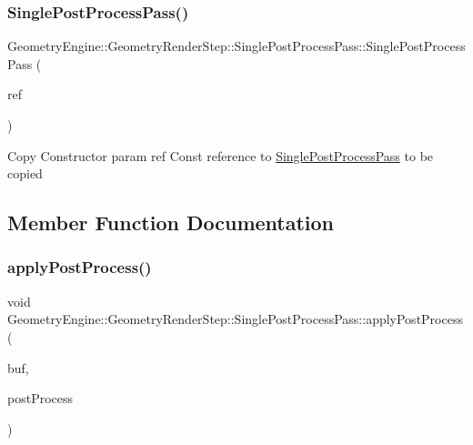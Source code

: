 \subsubsection{\texorpdfstring{SinglePostProcessPass()}{SinglePostProcessPass()}}
{\footnotesize\ttfamily Geometry\+Engine\+::\+Geometry\+Render\+Step\+::\+Single\+Post\+Process\+Pass\+::\+Single\+Post\+Process\+Pass (\begin{DoxyParamCaption}\item[{const \mbox{\hyperlink{class_geometry_engine_1_1_geometry_render_step_1_1_single_post_process_pass}{Single\+Post\+Process\+Pass}} \&}]{ref }\end{DoxyParamCaption})\hspace{0.3cm}{\ttfamily [inline]}}

Copy Constructor param ref Const reference to \mbox{\hyperlink{class_geometry_engine_1_1_geometry_render_step_1_1_single_post_process_pass}{Single\+Post\+Process\+Pass}} to be copied 

\subsection{Member Function Documentation}
\mbox{\label{class_geometry_engine_1_1_geometry_render_step_1_1_single_post_process_pass_a79ebdd8ab62f0872988993694d9522e4}} 
\subsubsection{\texorpdfstring{applyPostProcess()}{applyPostProcess()}}
{\footnotesize\ttfamily void Geometry\+Engine\+::\+Geometry\+Render\+Step\+::\+Single\+Post\+Process\+Pass\+::apply\+Post\+Process (\begin{DoxyParamCaption}\item[{\mbox{\hyperlink{class_geometry_engine_1_1_geometry_buffer_1_1_g_buffer}{Geometry\+Buffer\+::\+G\+Buffer}} $\ast$}]{buf,  }\item[{std\+::list$<$ \mbox{\hyperlink{class_geometry_engine_1_1_geometry_post_process_1_1_post_process}{Geometry\+Post\+Process\+::\+Post\+Process}} $\ast$ $>$}]{post\+Process }\end{DoxyParamCaption})\hspace{0.3cm}{\ttfamily [protected]}}

